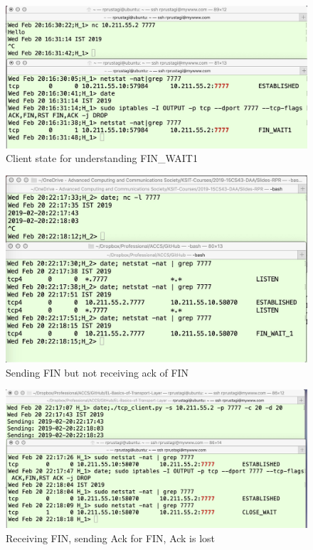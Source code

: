 \begin{figure}[!htb]
\centering
\includegraphics[scale=.22]{src/Figures/chap3/6.jpg}
\caption{Client state for understanding FIN\_WAIT1}\label{chap3-fig6}
\end{figure}

\begin{figure}[!htb]
\centering
\includegraphics[scale=.241]{src/Figures/chap3/7.jpg}
\caption{Sending FIN but not receiving ack of FIN}\label{chap3-fig7}
\end{figure}

\begin{figure}[!htb]
\centering
\includegraphics[scale=.42]{src/Figures/chap3/8.jpg}
\caption{Receiving FIN, sending Ack for FIN, Ack is lost}\label{chap3-fig8}
\end{figure}

